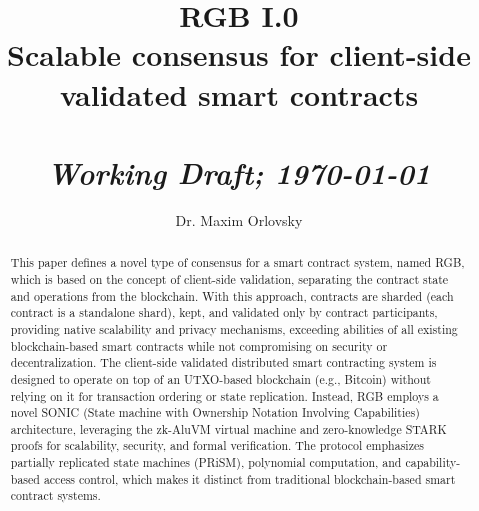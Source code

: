 \documentclass[9pt,oneside]{amsart}
\title[RGB I.0: Scalable consensus for client-side validated smart contracts]{RGB I.0\\Scalable consensus for client-side validated smart contracts\\ \smaller{Version I.0}\\ \it Working Draft; \today}
\author[M. Orlovsky]{Dr. Maxim Orlovsky}
\begin{document}
\pagecolor{yellow!10}

\begin{abstract}
This paper defines a novel type of consensus for a smart contract system, named RGB,
which is based on the concept of client-side validation,
separating the contract state and operations from the blockchain.
With this approach, contracts are sharded (each contract is a standalone shard),
kept, and validated only by contract participants,
providing native scalability and privacy mechanisms,
exceeding abilities of all existing blockchain-based smart contracts
while not compromising on security or decentralization.
The client-side validated distributed smart contracting system is
designed to operate on top of an UTXO-based blockchain (e.g., Bitcoin)
without relying on it for transaction ordering or state replication.
Instead, RGB employs a novel SONIC (State machine with Ownership Notation Involving Capabilities) architecture,
leveraging the zk-AluVM virtual machine and zero-knowledge STARK proofs
for scalability, security, and formal verification.
The protocol emphasizes partially replicated state machines (PRiSM),
polynomial computation, and capability-based access control,
which makes it distinct from traditional blockchain-based smart contract systems.
\end{abstract}

\maketitle
\end{document}
